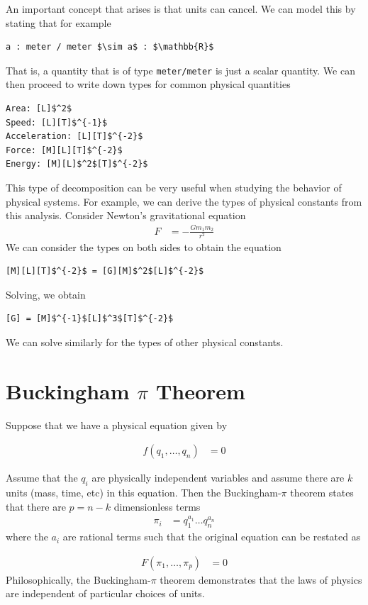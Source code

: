 \documentclass[book.tex]{subfiles}
\begin{document}
An important concept that arises is that units can cancel. We can model this by stating that for example

\begin{lstlisting}
a : meter / meter $\sim a$ : $\mathbb{R}$
\end{lstlisting}
That is, a quantity that is of type \lstinline{meter/meter} is just a scalar quantity. We can then proceed to write down types for common physical quantities

\begin{lstlisting}
Area: [L]$^2$
Speed: [L][T]$^{-1}$
Acceleration: [L][T]$^{-2}$
Force: [M][L][T]$^{-2}$
Energy: [M][L]$^2$[T]$^{-2}$
\end{lstlisting}

This type of decomposition can be very useful when studying the behavior of physical systems. For example, we can derive the types of physical constants from this analysis. Consider Newton's gravitational equation
\begin{align}
    F &= - \frac{G m_1 m_2}{r^2}
\end{align}
We can consider the types on both sides to obtain the equation
\begin{lstlisting}
[M][L][T]$^{-2}$ = [G][M]$^2$[L]$^{-2}$
\end{lstlisting}
Solving, we obtain
\begin{lstlisting}
[G] = [M]$^{-1}$[L]$^3$[T]$^{-2}$
\end{lstlisting}
We can solve similarly for the types of other physical constants.
\section{Buckingham $\pi$ Theorem}

Suppose that we have a physical equation given by

\begin{align}
    f(q_1,\dotsc,q_n) &= 0
\end{align}

Assume that the $q_i$ are physically independent variables and assume there are $k$ units (mass, time, etc) in this equation. Then the Buckingham-$\pi$ theorem states that there are $p = n - k$ dimensionless terms
\begin{align}
    \pi_i &= q_1^{a_1}\dotsc q_n^{a_n}
\end{align}
where the $a_i$ are rational terms such that the original equation can be restated as 

\begin{align}
    F(\pi_1,\dotsc,\pi_p) &= 0
\end{align}
Philosophically, the Buckingham-$\pi$ theorem demonstrates that the laws of physics are independent of particular choices of units. 

\end{document}
